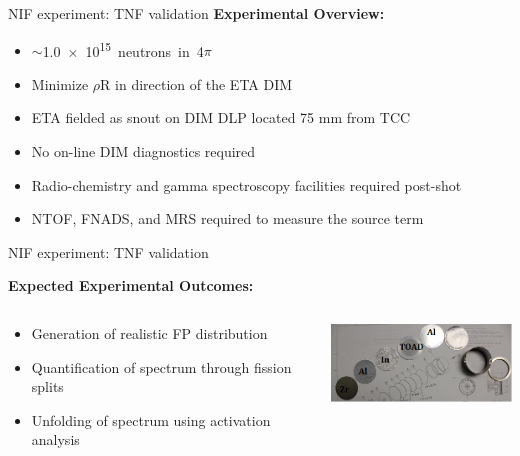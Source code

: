 \documentclass[xcolor=x11names,compress]{beamer}
\renewcommand{\(}{\begin{columns}}
\renewcommand{\)}{\end{columns}}
\newcommand{\<}[1]{\begin{column}{#1}}
\renewcommand{\>}{\end{column}}
\begin{document}
\begin{frame}{NIF experiment: TNF validation}
    \textbf{Experimental Overview:}
    \begin{itemize}
      \item $\sim$\SI{1.0e+15} neutrons in 4$\pi$
      \item Minimize $\rho$R in direction of the ETA DIM 
      \item ETA fielded as snout on DIM DLP located 75 mm from TCC
          
        \vspace{-0.25cm}
  \renewcommand*{\thesubfigure}{}
  \begin{figure}[htp]
    \centering
    \subcapcentertrue
  \end{figure} 
  
        \vspace{-1.0cm}  
      \item No on-line DIM diagnostics required
      \item Radio-chemistry and gamma spectroscopy facilities required post-shot
      \item NTOF, FNADS, and MRS required to measure the source term 
    \end{itemize}
    
\end{frame}

\begin{frame}{NIF experiment: TNF validation}

    \textbf{Expected Experimental Outcomes:}
      \begin{columns}
        \begin{column}{0.5\linewidth}
          \vspace{-0.15	cm} 
          \begin{itemize}
            \item Generation of realistic FP distribution
            \item Quantification of spectrum through fission splits
            \item Unfolding of spectrum using activation analysis
          \end{itemize}
        \end{column}
        
        \begin{column}{0.5\linewidth}
          \includegraphics[width=2.0in]{../figs/NAS2.png}
        \end{column}
      \end{columns}
\end{frame}
\end{document}
